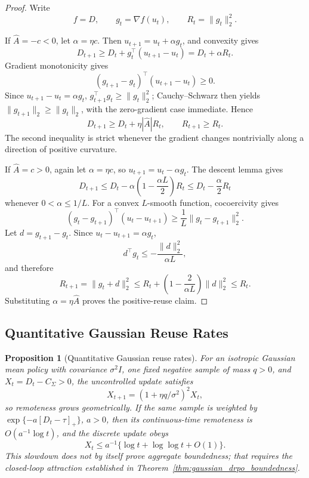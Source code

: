 \documentclass{article}
\theoremstyle{plain}
\newtheorem{proposition}[theorem]{Proposition}
\theoremstyle{definition}
\theoremstyle{remark}
\begin{document}
\begin{proof}
Write
\[
f=D,
\qquad
g_t=\nabla f(u_t),
\qquad
R_t=\|g_t\|_2^2.
\]

If \(\widehat A=-c<0\), let \(\alpha=\eta c\). Then
\(u_{t+1}=u_t+\alpha g_t\), and convexity gives
\[
D_{t+1}
\ge
D_t+g_t^\top(u_{t+1}-u_t)
=
D_t+\alpha R_t.
\]
Gradient monotonicity gives
\[
(g_{t+1}-g_t)^\top(u_{t+1}-u_t)\ge0.
\]
Since \(u_{t+1}-u_t=\alpha g_t\),
\(g_{t+1}^\top g_t\ge\|g_t\|_2^2\); Cauchy--Schwarz then yields
\(\|g_{t+1}\|_2\ge\|g_t\|_2\), with the zero-gradient case immediate.
Hence
\[
D_{t+1}
\ge
D_t+\eta|\widehat A|R_t,
\qquad
R_{t+1}\ge R_t.
\]
The second inequality is strict whenever the gradient changes
nontrivially along a direction of positive curvature.

If \(\widehat A=c>0\), again let \(\alpha=\eta c\), so
\(u_{t+1}=u_t-\alpha g_t\). The descent lemma gives
\[
D_{t+1}
\le
D_t-\alpha\left(1-\frac{\alpha L}{2}\right)R_t
\le
D_t-\frac{\alpha}{2}R_t
\]
whenever \(0<\alpha\le1/L\). For a convex \(L\)-smooth function,
cocoercivity gives
\[
(g_t-g_{t+1})^\top(u_t-u_{t+1})
\ge
\frac1L\|g_t-g_{t+1}\|_2^2.
\]
Let \(d=g_{t+1}-g_t\). Since \(u_t-u_{t+1}=\alpha g_t\),
\[
d^\top g_t
\le
-\frac{\|d\|_2^2}{\alpha L},
\]
and therefore
\[
R_{t+1}
=
\|g_t+d\|_2^2
\le
R_t+
\left(1-\frac{2}{\alpha L}\right)\|d\|_2^2
\le
R_t.
\]
Substituting \(\alpha=\eta\widehat A\) proves the positive-reuse claim.
\end{proof}

\subsection{Quantitative Gaussian Reuse Rates}
\label{app:gaussian_reuse_rate}

\begin{proposition}[Quantitative Gaussian reuse rates]
\label{prop:reuse_rate}
For an isotropic Gaussian mean policy with covariance \(\sigma^2I\),
one fixed negative sample of mass \(q>0\), and
\(X_t=D_t-C_\Sigma>0\), the uncontrolled update satisfies
\[
 X_{t+1}=\left(1+\eta q/\sigma^2\right)^2X_t,
\]
so remoteness grows geometrically. If the same sample is weighted by
\(\exp\{-a[D_t-\tau]_+\}\), \(a>0\), then its continuous-time
remoteness is \(O(a^{-1}\log t)\), and the discrete update obeys
\[
 X_t\le a^{-1}\{\log t+\log\log t+O(1)\}.
\]
This slowdown does not by itself prove aggregate boundedness; that requires
the closed-loop attraction established in
Theorem~\ref{thm:gaussian_drpo_boundedness}.
\end{proposition}
\end{document}
